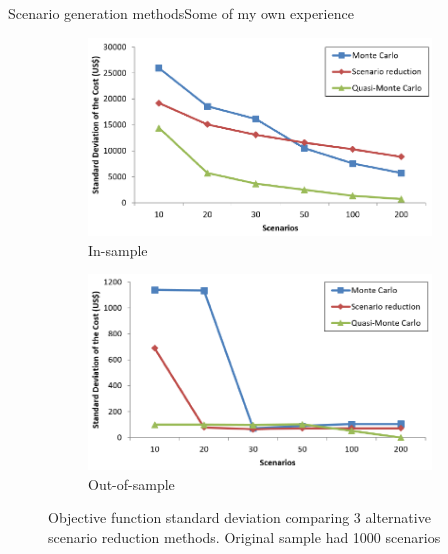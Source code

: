 \begin{frame}{Scenario generation methods}{Some of my own experience}

	
	\begin{figure}
		\begin{subfigure}{0.45\textwidth}
			\includegraphics[width=1.05\textwidth]{figures/stdev_cost_in.pdf}
			\caption{In-sample}
		\end{subfigure}
		\hfill
		\begin{subfigure}{0.45\textwidth}
			\includegraphics[width=1.05\textwidth]{figures/stdev_cost_out.pdf}
			\caption{Out-of-sample}
		\end{subfigure}
		\caption{Objective function standard deviation comparing 3 alternative scenario reduction methods. Original sample had 1000 scenarios \cite{fernandez2018optimizing}}	
	\end{figure}



	
\end{frame}


